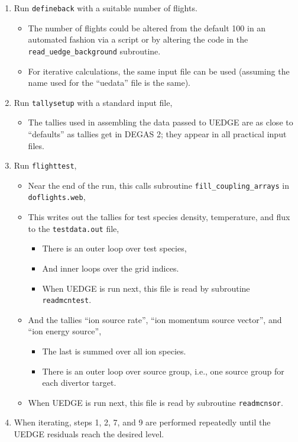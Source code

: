\documentclass[11pt]{article}
\begin{document}
\begin{enumerate}
\begin{itemize}
\begin{itemize}
      \item Note that these capabilities would give rise to unbalanced sources \& sinks if the DEGAS 2 output were passed back to UEDGE.
    \end{itemize}
  \end{itemize}
  \item Run {\tt defineback} with a suitable number of flights.
  \begin{itemize}
    \item The number of flights could be altered from the default 100 in an automated fashion via a script or by altering the code in the \verb+read_uedge_background+ subroutine.
    \item For iterative calculations, the same input file can be used (assuming the name used for the ``uedata'' file is the same).
  \end{itemize}
  \item Run {\tt tallysetup} with a standard input file,
  \begin{itemize}
    \item The tallies used in assembling the data passed to UEDGE are as close to ``defaults'' as tallies get in DEGAS 2; they appear in all practical input files.
  \end{itemize}
  \item Run {\tt flighttest},
  \begin{itemize}
    \item Near the end of the run, this calls subroutine \verb+fill_coupling_arrays+ in {\tt doflights.web},
    \item This writes out the tallies for test species density, temperature, and flux to the \verb+testdata.out+ file,
    \begin{itemize}
      \item There is an outer loop over test species,
      \item And inner loops over the grid indices.
      \item When UEDGE is run next, this file is read by subroutine \verb+readmcntest+.
    \end{itemize}
    \item And the tallies ``ion source rate'', ``ion momentum source vector'', and ``ion energy source'',
    \begin{itemize}
      \item The last is summed over all ion species.
      \item There is an outer loop over source group, i.e., one source group for each divertor target.
    \end{itemize}
    \item When UEDGE is run next, this file is read by subroutine \verb+readmcnsor+.
  \end{itemize}
  \item When iterating, steps 1, 2, 7, and 9 are performed repeatedly until the UEDGE residuals reach the desired level.
\end{enumerate}
\end{document}
